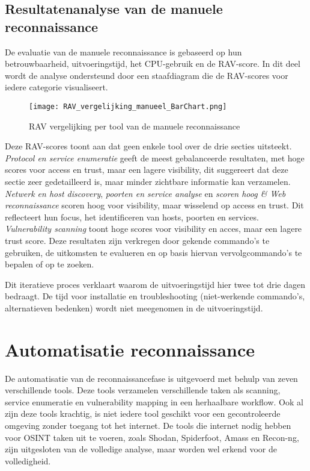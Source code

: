 \subsection{Resultatenanalyse van de manuele reconnaissance}

De evaluatie van de manuele reconnaissance is gebaseerd op hun betrouwbaarheid, uitvoeringstijd, het CPU-gebruik en de RAV-score.
In dit deel wordt de analyse ondersteund door een staafdiagram die de RAV-scores voor iedere categorie visualiseert.

\begin{figure}[H] 
\centering
\texttt{[image: RAV\_vergelijking\_manueel\_BarChart.png]}
\caption{RAV vergelijking per tool van de manuele reconnaissance}
\label{fig:rav_barplot_manueel}
\end{figure}


Deze RAV-scores toont aan dat geen enkele tool over de drie secties uitsteekt.
\textit{Protocol en service enumeratie} geeft de meest gebalanceerde resultaten, met hoge scores voor access en trust, maar een lagere visibility, dit suggereert dat deze sectie zeer gedetailleerd is, maar minder zichtbare informatie kan verzamelen.
\textit{Netwerk en host discovery}, \textit{poorten en service analyse} en \textit{scoren hoog & Web reconnaissance} scoren hoog voor visibility, maar wisselend op access en trust. Dit reflecteert hun focus, het identificeren van hosts, poorten en services.
\textit{Vulnerability scanning} toont hoge scores voor visibility en acces, maar een lagere trust score.
Deze resultaten zijn verkregen door gekende commando's te gebruiken, de uitkomsten te evalueren en op basis hiervan vervolgcommando's te bepalen of op te zoeken.

Dit iteratieve proces verklaart waarom de uitvoeringstijd hier twee tot drie dagen bedraagt.
De tijd voor installatie en troubleshooting (niet-werkende commando's, alternatieven bedenken) wordt niet meegenomen in de uitvoeringstijd.


\section{Automatisatie reconnaissance}

De automatisatie van de reconnaissancefase is uitgevoerd met behulp van zeven verschillende tools.
Deze tools verzamelen verschillende taken als scanning, service enumeratie en vulnerability mapping in een herhaalbare workflow.
Ook al zijn deze tools krachtig, is niet iedere tool geschikt voor een gecontroleerde omgeving zonder toegang tot het internet.
De tools die internet nodig hebben voor OSINT taken uit te voeren, zoals Shodan, Spiderfoot, Amass en Recon-ng, zijn uitgesloten van de volledige analyse, maar worden wel erkend voor de volledigheid.

